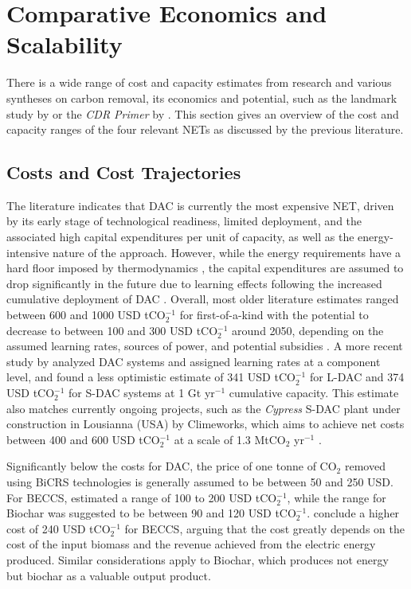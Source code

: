 \section{Comparative Economics and Scalability}
There is a wide range of cost and capacity estimates from research and various syntheses on carbon removal, its economics and potential, such as the landmark study by \textcite{fuss_negative_2018} or the \textit{CDR Primer} by \textcite{dipple_building_2021}. This section gives an overview of the cost and capacity ranges of the four relevant NETs as discussed by the previous literature.
\subsection{Costs and Cost Trajectories}
The literature indicates that DAC is currently the most expensive NET, driven by its early stage of technological readiness, limited deployment, and the associated high capital expenditures per unit of capacity, as well as the energy-intensive nature of the approach. However, while the energy requirements have a hard floor imposed by thermodynamics \parencite{lackner_thermodynamics_2013}, the capital expenditures are assumed to drop significantly in the future due to learning effects following the increased cumulative deployment of DAC \parencite{sievert_considering_2024, young_cost_2022, dipple_building_2021}. Overall, most older literature estimates ranged between 600 and 1000 USD tCO$_2^{-1}$ for first-of-a-kind with the potential to decrease to between 100 and 300 USD tCO$_2^{-1}$ around 2050, depending on the assumed learning rates, sources of power, and potential subsidies \parencite{fuss_negative_2018}. A more recent study by \textcite{sievert_considering_2024} analyzed DAC systems and assigned learning rates at a component level, and found a less optimistic estimate of 341 USD tCO$_2^{-1}$ for L-DAC and 374 USD tCO$_2^{-1}$ for S-DAC systems at 1 Gt yr$^{-1}$ cumulative capacity. This estimate also matches currently ongoing projects, such as the \textit{Cypress} S-DAC plant under construction in Lousianna (USA) by Climeworks, which aims to achieve net costs between 400 and 600 USD tCO$_2^{-1}$ at a scale of 1.3 MtCO$_2$ yr$^{-1}$ \parencite{climeworks_climeworks_2024}.\vspace{2mm}

Significantly below the costs for DAC, the price of one tonne of CO$_2$ removed using BiCRS technologies is generally assumed to be between 50 and 250 USD. For BECCS, \textcite{fuss_negative_2018} estimated a range of 100 to 200 USD tCO$_2^{-1}$, while the range for Biochar was suggested to be between 90 and 120 USD tCO$_2^{-1}$. \textcite{fajardy_economics_2021} conclude a higher cost of 240 USD tCO$_2^{-1}$ for BECCS, arguing that the cost greatly depends on the cost of the input biomass and the revenue achieved from the electric energy produced. Similar considerations apply to Biochar, which produces not energy but biochar as a valuable output product.\vspace{2mm}

